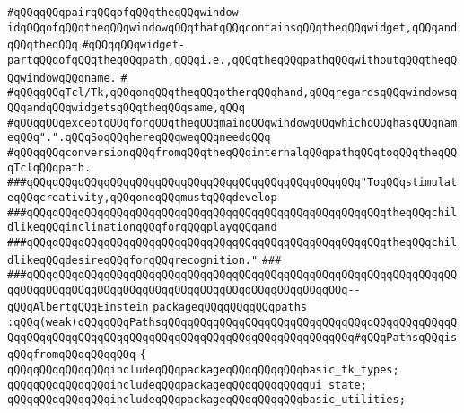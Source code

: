 \verb|#qQQqqQQqpairqQQqofqQQqtheqQQqwindow-idqQQqofqQQqtheqQQqwindowqQQqthatqQQqcontainsqQQqtheqQQqwidget,qQQqandqQQqtheqQQq|\newline
\verb|#qQQqqQQqwidget-partqQQqofqQQqtheqQQqpath,qQQqi.e.,qQQqtheqQQqpathqQQqwithoutqQQqtheqQQqwindowqQQqname.|\newline
\verb|#|\newline
\verb|#qQQqqQQqTcl/Tk,qQQqonqQQqtheqQQqotherqQQqhand,qQQqregardsqQQqwindowsqQQqandqQQqwidgetsqQQqtheqQQqsame,qQQq|\newline
\verb|#qQQqqQQqexceptqQQqforqQQqtheqQQqmainqQQqwindowqQQqwhichqQQqhasqQQqnameqQQq".".qQQqSoqQQqhereqQQqweqQQqneedqQQq|\newline
\verb|#qQQqqQQqconversionqQQqfromqQQqtheqQQqinternalqQQqpathqQQqtoqQQqtheqQQqTclqQQqpath.|\newline
\newline
\newline
\newline
\verb|###qQQqqQQqqQQqqQQqqQQqqQQqqQQqqQQqqQQqqQQqqQQqqQQqqQQq"ToqQQqstimulateqQQqcreativity,qQQqoneqQQqmustqQQqdevelop|\newline
\verb|###qQQqqQQqqQQqqQQqqQQqqQQqqQQqqQQqqQQqqQQqqQQqqQQqqQQqqQQqtheqQQqchildlikeqQQqinclinationqQQqforqQQqplayqQQqand|\newline
\verb|###qQQqqQQqqQQqqQQqqQQqqQQqqQQqqQQqqQQqqQQqqQQqqQQqqQQqqQQqtheqQQqchildlikeqQQqdesireqQQqforqQQqrecognition."|\newline
\verb|###|\newline
\verb|###qQQqqQQqqQQqqQQqqQQqqQQqqQQqqQQqqQQqqQQqqQQqqQQqqQQqqQQqqQQqqQQqqQQqqQQqqQQqqQQqqQQqqQQqqQQqqQQqqQQqqQQqqQQqqQQqqQQqqQQq--qQQqAlbertqQQqEinstein|\newline
\newline
\newline
\newline
\verb|packageqQQqqQQqqQQqpaths|\newline
\verb|:qQQq(weak)qQQqqQQqPathsqQQqqQQqqQQqqQQqqQQqqQQqqQQqqQQqqQQqqQQqqQQqqQQqqQQqqQQqqQQqqQQqqQQqqQQqqQQqqQQqqQQqqQQqqQQqqQQqqQQq#qQQqPathsqQQqisqQQqfromqQQqqQQqqQQq|\newline
\verb|{|\newline
\verb|qQQqqQQqqQQqqQQqincludeqQQqpackageqQQqqQQqqQQqbasic_tk_types;|\newline
\verb|qQQqqQQqqQQqqQQqincludeqQQqpackageqQQqqQQqqQQqgui_state;|\newline
\verb|qQQqqQQqqQQqqQQqincludeqQQqpackageqQQqqQQqqQQqbasic_utilities;|\newline
